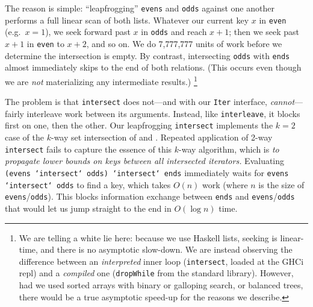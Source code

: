 \documentclass[acmsmall,screen,dvipsnames,svgnames]{acmart}
\newcommand\hask[1]{\texttt{#1}}
\newcommand\ttt\texttt
\begin{document}
\noindent
The reason is simple: ``leapfrogging'' \ttt{evens} and \ttt{odds} against one another performs a full linear scan of both lists.
Whatever our current key $x$ in \ttt{even} (e.g.\ $x = 1$), we seek forward past $x$ in \ttt{odds} and reach $x+1$; then we seek past $x+1$ in \ttt{even} to $x + 2$, and so on.
We do 7,777,777 units of work before we determine the intersection is empty.
%
By contrast, intersecting \ttt{odds} with \ttt{ends} almost immediately skips to the end of both relations.
(This occurs even though we are \emph{not} materializing any intermediate results.)%
\footnote{\label{fn:white-lie}%
  We are telling a white lie here: because we use Haskell lists, seeking is linear-time, and there is no asymptotic slow-down.
  We are instead observing the difference between an \emph{interpreted} inner loop (\ttt{intersect}, loaded at the GHCi repl) and a \emph{compiled} one (\ttt{dropWhile} from the standard library).
  However, had we used sorted arrays with binary or galloping search, or balanced trees, there would be a true asymptotic speed-up for the reasons we describe.
}

The problem is that \ttt{intersect} does not---and with our \hask{Iter} interface, \emph{cannot}---fairly interleave work between its arguments.
Instead, like \ttt{interleave}, it blocks first on one, then the other.
Our leapfrogging \ttt{intersect} implements the $k=2$ case of the $k$-way set intersection of \citet{DBLP:conf/soda/DemaineLM00} and \citet{lftj}.
Repeated application of 2-way \ttt{intersect} fails to capture the essence of this $k$-way algorithm, which is \emph{to propagate lower bounds on keys between all intersected iterators.}
Evaluating \ttt{(evens `intersect` odds) `intersect` ends} immediately waits for \ttt{evens `intersect` odds} to find a key, which takes $O(n)$ work (where $n$ is the size of \ttt{evens}/\ttt{odds}).
This blocks information exchange between \ttt{ends} and \ttt{evens}/\ttt{odds} that would let us jump straight to the end in $O(\log n)$ time.
\end{document}
